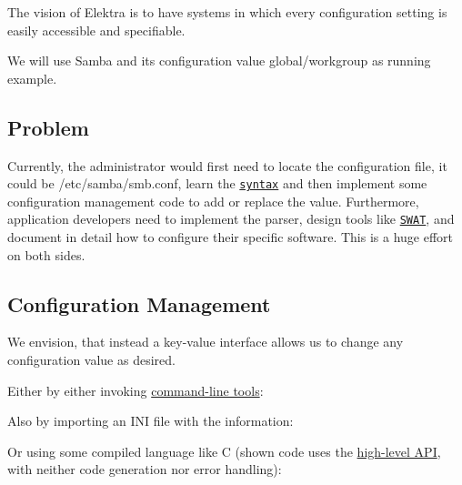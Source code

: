 The vision of Elektra is to have systems in which every configuration setting is easily accessible and specifiable.

We will use Samba and its configuration value {\ttfamily global/workgroup} as running example.

\subsection*{Problem}

Currently, the administrator would first need to locate the configuration file, it could be {\ttfamily /etc/samba/smb.conf}, learn the \href{https://www.samba.org/samba/docs/current/man-html/smb.conf.5.html}{\tt syntax} and then implement some configuration management code to add or replace the value. Furthermore, application developers need to implement the parser, design tools like \href{https://www.samba.org/samba/docs/old/Samba3-HOWTO/SWAT.html}{\tt S\+W\+AT}, and document in detail how to configure their specific software. This is a huge effort on both sides.

\subsection*{Configuration Management}

We envision, that instead a key-\/value interface allows us to change any configuration value as desired.

Either by either invoking \hyperlink{doc_help_kdb_md}{command-\/line tools}\+:




Also by importing an I\+NI file with the information\+:




Or using some compiled language like C (shown code uses the \hyperlink{src_libs_highlevel_README_md}{high-\/level A\+PI}, with neither code generation nor error handling)\+:




